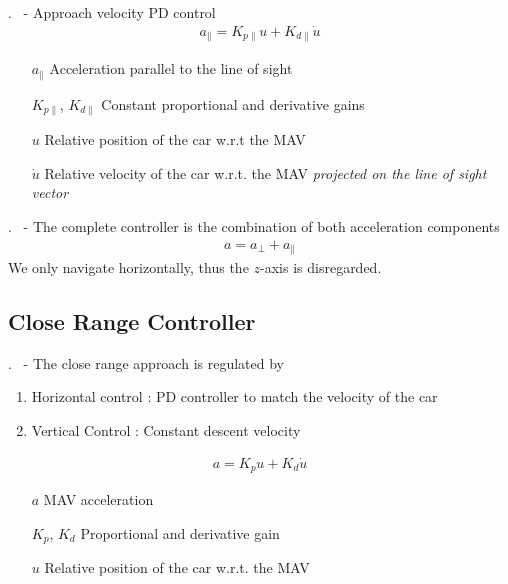 
\begin{frame}{\thesection. \insertsection \ - \insertsubsection}
	Approach velocity PD control
	\begin{align}
		a_\parallel = K_{p\parallel} u + K_{d\parallel} \dot{u} 
	\end{align}
	\begin{enumerate}
		\item[$a_\parallel$] Acceleration parallel to the line of sight
		\item[$K_{p\parallel}$, $K_{d\parallel}$] Constant proportional and derivative gains
		\item[$u$] Relative position of the car w.r.t the MAV
		\item[$\dot{u}$] Relative velocity of the car w.r.t. the MAV \textit{projected on the line of sight vector}
	\end{enumerate}
\end{frame}


\begin{frame}{\thesection. \insertsection \ - \insertsubsection}
	The complete controller is the combination of both acceleration components
	\begin{align}
		a = a_\perp + a_\parallel
	\end{align}
	We only navigate horizontally, thus the $z$-axis is disregarded.
\end{frame}


\subsection{Close Range Controller}
\begin{frame}{\thesection. \insertsection \ - \insertsubsection}
	The close range approach is regulated by
	\begin{enumerate}
		\item Horizontal control : PD controller to match the velocity of the car
		\item Vertical Control : Constant descent velocity
	\end{enumerate}

	\begin{align}
		a = K_p u + K_d \dot{u}
	\end{align}
	\begin{enumerate}
		\item[$a$] MAV acceleration
		\item[$K_p$, $K_d$] Proportional and derivative gain
		\item[$u$] Relative position of the car w.r.t. the MAV 
	\end{enumerate}
\end{frame}

